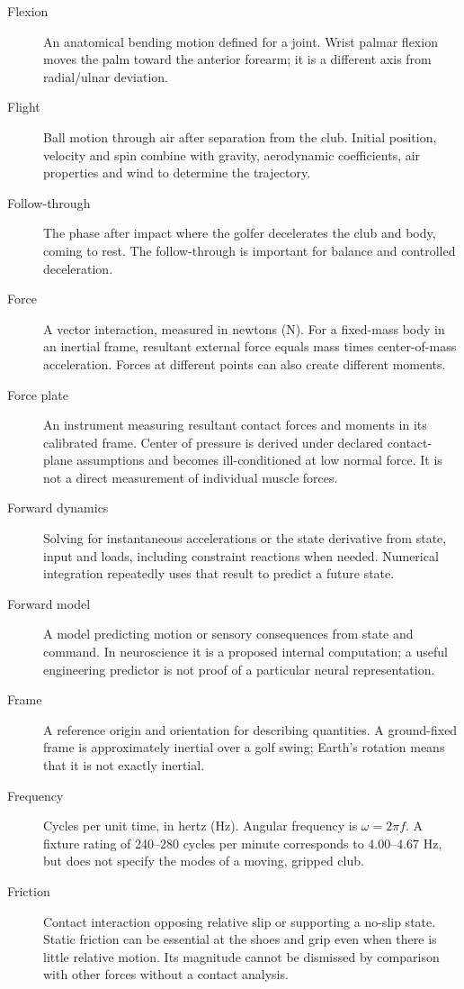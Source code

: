 \begin{description}
\item[Flexion] An anatomical bending motion defined for a joint. Wrist palmar flexion moves the palm toward the anterior forearm; it is a different axis from radial/ulnar deviation.

\item[Flight] Ball motion through air after separation from the club. Initial position, velocity and spin combine with gravity, aerodynamic coefficients, air properties and wind to determine the trajectory.

\item[Follow-through] The phase after impact where the golfer decelerates the club and body, coming to rest. The follow-through is important for balance and controlled deceleration.

\item[Force] A vector interaction, measured in newtons (N). For a fixed-mass body in an inertial frame, resultant external force equals mass times center-of-mass acceleration. Forces at different points can also create different moments.

\item[Force plate] An instrument measuring resultant contact forces and moments in its calibrated frame. Center of pressure is derived under declared contact-plane assumptions and becomes ill-conditioned at low normal force. It is not a direct measurement of individual muscle forces.

\item[Forward dynamics] Solving for instantaneous accelerations or the state derivative from state, input and loads, including constraint reactions when needed. Numerical integration repeatedly uses that result to predict a future state.

\item[Forward model] A model predicting motion or sensory consequences from state and command. In neuroscience it is a proposed internal computation; a useful engineering predictor is not proof of a particular neural representation.

\item[Frame] A reference origin and orientation for describing quantities. A ground-fixed frame is approximately inertial over a golf swing; Earth's rotation means that it is not exactly inertial.

\item[Frequency] Cycles per unit time, in hertz (Hz). Angular frequency is $\omega=2\pi f$. A fixture rating of 240--280 cycles per minute corresponds to 4.00--4.67 Hz, but does not specify the modes of a moving, gripped club.

\item[Friction] Contact interaction opposing relative slip or supporting a no-slip state. Static friction can be essential at the shoes and grip even when there is little relative motion. Its magnitude cannot be dismissed by comparison with other forces without a contact analysis.

\end{description}
